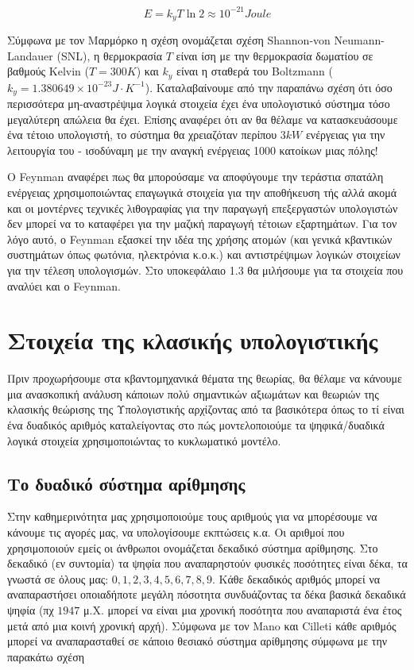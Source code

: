 \begin{equation}
    E = k_y T \ln 2 \approx 10^{-21} Joule
\end{equation}

Σύμφωνα με τον Μαρμόρκο \cite{Marmorkos2024} η σχέση ονομάζεται σχέση Shannon-von Neumann-Landauer (SNL), η θερμοκρασία $T$ είναι ίση με την
θερμοκρασία δωματίου σε βαθμούς Kelvin ($T = 300 K$) και $k_y$ είναι η σταθερά του Boltzmann ($k_y = 1.380649 \times 10^{-23}J \cdot K^{-1}$).
Καταλαβαίνουμε από την παραπάνω σχέση ότι όσο περισσότερα μη-αναστρέψιμα λογικά στοιχεία έχει ένα υπολογιστικό σύστημα τόσο μεγαλύτερη απώλεια
θα έχει. Επίσης αναφέρει ότι αν θα θέλαμε να κατασκευάσουμε ένα τέτοιο υπολογιστή, το σύστημα θα χρειαζόταν περίπου $3kW$
ενέργειας για την λειτουργία του - ισοδύναμη με την αναγκή ενέργειας 1000 κατοίκων μιας πόλης!

Ο Feynman \cite{Feynman1986} αναφέρει πως θα μπορούσαμε να αποφύγουμε την τεράστια σπατάλη ενέργειας χρησιμοποιώντας επαγωγικά στοιχεία για την αποθήκευση τής αλλά ακομά και οι μοντέρνες τεχνικές λιθογραφίας για την παραγωγή επεξεργαστών υπολογιστών δεν μπορεί να το καταφέρει για την 
μαζική παραγωγή τέτοιων εξαρτημάτων. Για τον λόγο αυτό, ο Feynman εξασκεί την ιδέα της χρήσης ατομών (και γενικά κβαντικών συστημάτων όπως
φωτόνια, ηλεκτρόνια κ.ο.κ.) και αντιστρέψιμων λογικών στοιχείων για την τέλεση υπολογισμών. Στο υποκεφάλαιο 1.3 θα μιλήσουμε για τα στοιχεία που
αναλύει και ο Feynman.

\section{Στοιχεία της κλασικής υπολογιστικής}

Πριν προχωρήσουμε στα κβαντομηχανικά θέματα της θεωρίας, θα θέλαμε να κάνουμε μια ανασκοπική ανάλυση κάποιων πολύ σημαντικών αξιωμάτων και θεωριών
της κλασικής θεώρισης της Υπολογιστικής αρχίζοντας από τα βασικότερα όπως το τί είναι ένα δυαδικός αριθμός καταλείγοντας στο πώς μοντελοποιούμε
τα ψηφικά/δυαδικά λογικά στοιχεία χρησιμοποιώντας το κυκλωματικό μοντέλο.

\subsection{Το δυαδικό σύστημα αρίθμησης}

Στην καθημερινότητα μας χρησιμοποιούμε τους αριθμούς για να μπορέσουμε να κάνουμε τις αγορές μας, να υπολογίσουμε εκπτώσεις κ.α. Οι αριθμοί που
χρησιμοποιούν εμείς οι άνθρωποι ονομάζεται δεκαδικό σύστημα αρίθμησης. Στο δεκαδικό (εν συντομία) τα ψηφία που αναπαρηστούν φυσικές ποσότητες είναι
δέκα, τα γνωστά σε όλους μας: $0, 1, 2, 3, 4, 5, 6, 7, 8, 9$. Κάθε δεκαδικός αριθμός μπορεί να αναπαραστήσει οποιαδήποτε μεγάλη πόσοτητα συνδυάζοντας
τα δέκα βασικά δεκαδικά ψηφία (πχ $1947$ μ.Χ. μπορεί να είναι μια χρονική ποσότητα που αναπαριστά ένα έτος μετά από μια κοινή χρονική αρχή). Σύμφωνα
με τον Mano και Cilleti \cite{ManoCilleti2018} κάθε αριθμός μπορεί να αναπαρασταθεί σε κάποιο θεσιακό σύστημα αρίθμησης σύμφωνα με την παρακάτω
σχέση

